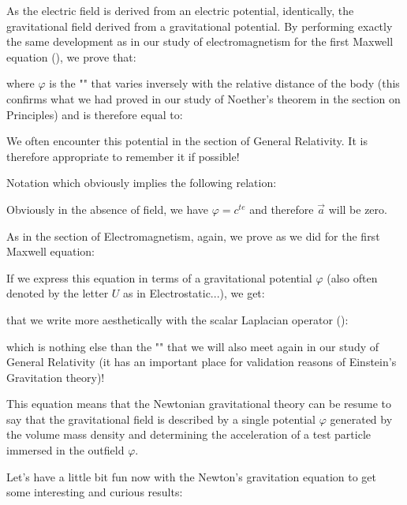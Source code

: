 	As the electric field is derived from an electric potential, identically, the gravitational field derived from a gravitational potential\label{gravitation potential}. By performing exactly the same development as in  our study of electromagnetism for the first Maxwell equation (), we prove that:
	
	where $\varphi$ is the "" that varies inversely with the relative distance of the body (this confirms what we had proved in our study of Noether's theorem in the section on Principles) and is therefore equal to:
	
	\begin{tcolorbox}[title=Remark,colframe=black,arc=10pt]
	We often encounter this potential in the section of General Relativity. It is therefore appropriate to remember it if possible!
	\end{tcolorbox}	
	Notation which obviously implies the following relation:
	
	\begin{tcolorbox}[title=Remark,colframe=black,arc=10pt]
	Obviously in the absence of field, we have $\varphi=c^{te}$ and therefore $\vec{a}$  will be zero.
	\end{tcolorbox}
	As in the section of Electromagnetism, again, we prove as we did for the first Maxwell equation:
	
	If we express this equation in terms of a gravitational potential $\varphi$ (also often denoted by the letter $U$ as in Electrostatic...), we get:
	
	that we write more aesthetically with the scalar Laplacian operator ():
	
	which is nothing else than the "\label{newton-poisson equation}" that we will  also meet again in our study of General Relativity (it has an important place for validation reasons of Einstein's Gravitation theory)!
	
	This equation means that the Newtonian gravitational theory can be resume to say that the gravitational field is described by a single potential $\varphi$ generated by the volume mass density and determining the acceleration of a test particle immersed in the outfield $\varphi$.
	
	Let's have a little bit fun now with the Newton's gravitation equation to get some interesting and curious results:
	
